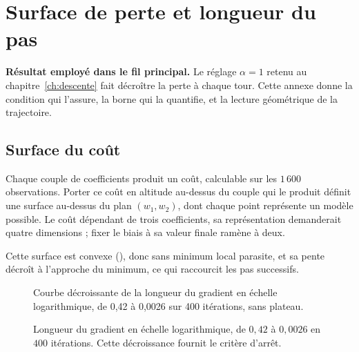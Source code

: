 \chapter{Surface de perte et longueur du pas}
\label{ann:optimisation}


\textbf{Résultat employé dans le fil principal.} Le réglage $\alpha=1$ retenu au
chapitre~\ref{ch:descente} fait décroître la perte à chaque tour. Cette annexe
donne la condition qui l'assure, la borne qui la quantifie, et la lecture
géométrique de la trajectoire.

\section{Surface du coût}

Chaque couple de coefficients produit un coût, calculable sur les $1\,600$
observations. Porter ce coût en altitude au-dessus du couple qui le produit
définit une surface au-dessus du plan $(w_1,w_2)$, dont chaque point représente
un modèle possible. Le coût dépendant de trois coefficients, sa représentation
demanderait quatre dimensions ; fixer le biais à sa valeur finale ramène à deux.

Cette surface est convexe (), donc sans minimum local
parasite, et sa pente décroît à l'approche du minimum, ce qui raccourcit les pas
successifs.

\begin{figure}[htbp]
\centering
\begin{graphique}{Courbe décroissante de la longueur du gradient en échelle logarithmique, de 0,42 à 0,0026 sur 400 itérations, sans plateau.}
\end{graphique}
\caption{Longueur du gradient en échelle logarithmique, de $0{,}42$ à
$0{,}0026$ en $400$ itérations. Cette décroissance fournit le critère d'arrêt.}
\label{fig:ann-opt-norme-gradient}
\end{figure}

